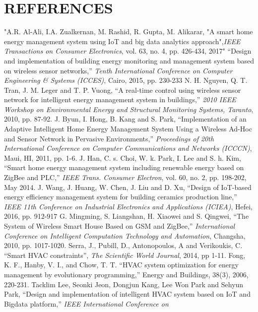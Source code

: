 \documentclass[a4paper,12pt,oneside]{article}
\begin{document}
\section{REFERENCES}
\begin{thebibliography}{9}

"A.R. Al-Ali, I.A. Zualkernan, M. Rashid, R. Gupta, M. Alikarar, "A smart home energy management system using IoT and big data analytics approach",\emph{IEEE Transactions on Consumer Electronics}, vol. 63, no. 4, pp. 426-434, 2017"
“Design and implementation of building energy monitoring and
management system based on wireless sensor networks,” \emph{Tenth International Conference on Computer Engineering \& Systems (ICCES)},
Cairo, 2015, pp. 230-233
N. H. Nguyen, Q. T. Tran, J. M. Leger and T. P. Vuong, “A real-time
control using wireless sensor network for intelligent energy management
system in buildings,” \emph{ 2010 IEEE Workshop on Environmental Energy
and Structural Monitoring Systems, Taranto}, 2010, pp. 87-92.
J. Byun, I. Hong, B. Kang and S. Park, “Implementation of an Adaptive
Intelligent Home Energy Management System Using a Wireless Ad-Hoc
and Sensor Network in Pervasive Environments,” \emph{Proceedings of
20th International Conference on Computer Communications and
Networks (ICCCN)}, Maui, HI, 2011, pp. 1-6.
J. Han, C. s. Choi, W. k. Park, I. Lee and S. h. Kim, “Smart home energy
management system including renewable energy based on ZigBee and PLC,”
\emph{IEEE Trans. Consumer Electron}, vol. 60, no. 2, pp. 198-202, May 2014.
J. Wang, J. Huang, W. Chen, J. Liu and D. Xu, “Design of IoT-based
energy efficiency management system for building ceramics production
line,” \emph{ IEEE 11th Conference on Industrial Electronics and
Applications (ICIEA)}, Hefei, 2016, pp. 912-917
G. Mingming, S. Liangshan, H. Xiaowei and S. Qingwei, “The System
of Wireless Smart House Based on GSM and ZigBee,” \emph{
International Conference on Intelligent Computation Technology and
Automation}, Changsha, 2010, pp. 1017-1020.
Serra, J., Pubill, D., Antonopoulos, A  and Verikoukis, C. “Smart HVAC constraints”, \emph{The Scientific World Journal}, 2014, pp 1-11.
Fong, K. F., Hanby, V. I., and Chow, T. T. “HVAC system optimization
for energy management by evolutionary programming,” Energy and
Buildings, 38(3), 2006, 220-231.
Tacklim Lee, Seonki Jeon, Dongjun Kang, Lee Won Park and Sehyun
Park, “Design and implementation of intelligent HVAC system based on
IoT and Bigdata platform,” \emph{IEEE International Conference on
}
\end{thebibliography}
\end{document}

